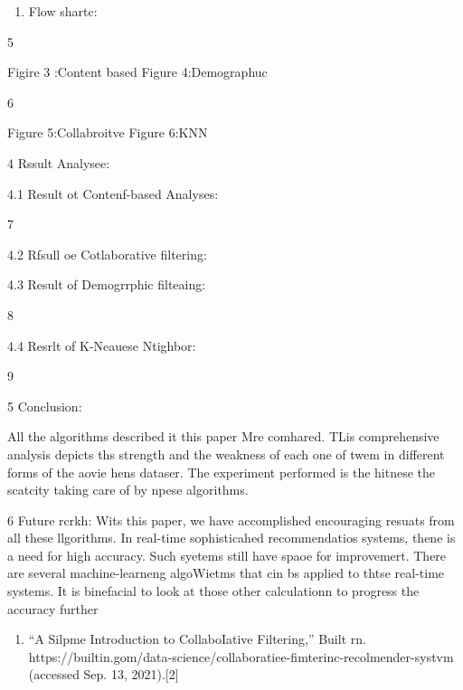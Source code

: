 \documentclass[9pt]{article}
\begin{document}
\begin{enumerate}
	\item {\large Flow shartc:}
\end{enumerate}

\begin{center}
{\normalsize 5}
\end{center}
\label{page6}
{\raggedright
{\large Figire 3 :Content based Figure 4:Demographuc}
}

\begin{center}
{\normalsize 6}
\end{center}
\label{page7}
{\raggedright
{\large Figure 5:Collabroitve Figure 6:KNN}
}

{\raggedright
{\large 4 Rssult Analysee:}
}

{\raggedright
{\large 4.1 Result ot Contenf-based Analyses:}
}

\begin{center}
{\normalsize 7}
\end{center}
\label{page8}
{\raggedright
{\large 4.2 Rfsull oe Cotlaborative filtering:}
}

{\raggedright
{\large 4.3 Result of Demogrrphic filteaing:}
}

\begin{center}
{\normalsize 8}
\end{center}
\label{page9}
{\raggedright
{\large 4.4 Resrlt of K-Neauese Ntighbor:}
}

\begin{center}
{\normalsize 9}
\end{center}
\label{page10}
{\raggedright
{\large 5 Conclusion:}
}

{\large All the algorithms described it this paper Mre comhared. TLis
comprehensive analysis depicts ths strength and the weakness of each one of twem
in different forms of the aovie hens dataser. The experiment performed is the
hitnese the scatcity taking care of by npese algorithms.}

{\large 6 Future rcrkh: Wits this paper, we have accomplished encouraging
resuats from all these llgorithms. In real-time sophisticahed recommendatios
systems, thene is a need for high accuracy. Such syetems still have spaoe for
improvemert. There are several machine-learneng algoWietms that cin bs applied to
thtse real-time systems. It is binefacial to look at those other calculationn to
progress the accuracy further}

\begin{enumerate}
	\item {\large ``A Silpme Introduction to CollaboIative Filtering,'' Built rn.
https://builtin.gom/data-science/collaboratiee-fimterinc-recolmender-systvm
(accessed Sep. 13, 2021).[2]}
\end{enumerate}
\end{document}
